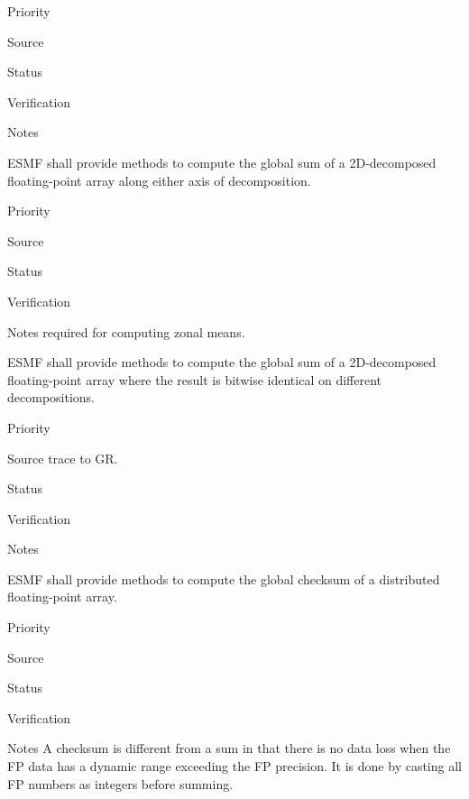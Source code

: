\begin{reqlist}
\item[Priority]
\item[Source]
\item[Status]
\item[Verification]
\item[Notes]
\end{reqlist}


ESMF shall provide methods to compute the global sum of a 2D-decomposed
floating-point array along either axis of decomposition.

\begin{reqlist}
\item[Priority]
\item[Source]
\item[Status]
\item[Verification]
\item[Notes] required for computing zonal means.
\end{reqlist}


ESMF shall provide methods to compute the global sum of a
2D-decomposed floating-point array where the result is bitwise
identical on different decompositions.

\begin{reqlist}
\item[Priority]
\item[Source] trace to GR.
\item[Status]
\item[Verification]
\item[Notes]
\end{reqlist}


ESMF shall provide methods to compute the global checksum of a
distributed floating-point array. 

\begin{reqlist}
\item[Priority]
\item[Source]
\item[Status]
\item[Verification]
\item[Notes] A checksum is different from a sum in that there is no
  data loss when the FP data has a dynamic range exceeding the FP
  precision. It is done by casting all FP numbers as integers before
  summing.
\end{reqlist}

